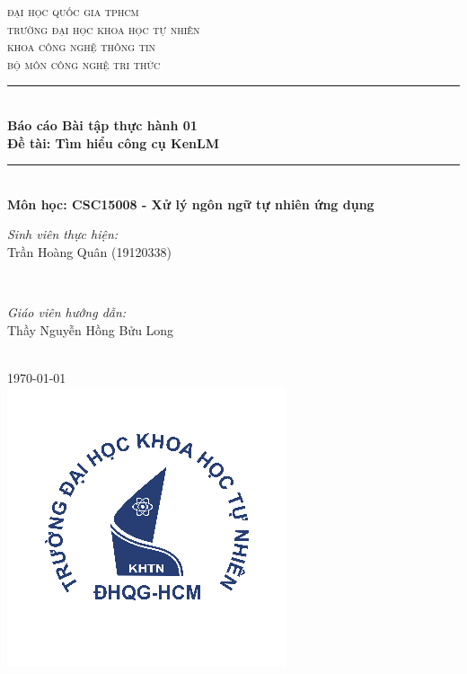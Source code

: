 \documentclass[12pt]{article}
\begin{document}
\begin{titlepage}
\newcommand{\HRule}{\rule{\linewidth}{0.5mm}}
\centering

\textsc{\LARGE đại học quốc gia tphcm}\\[1.5cm]
\textsc{\Large trường đại học khoa học tự nhiên}\\[0.5cm]
\textsc{\large khoa công nghệ thông tin}\\[0.5cm]
\textsc{bộ môn công nghệ tri thức}\\[0.5cm]

\HRule \\[0.4cm]
{ 
\huge{\bfseries{Báo cáo Bài tập thực hành 01}}\\[0.5cm]
\large{\bfseries{Đề tài: Tìm hiểu công cụ KenLM}}
}\\[0.4cm]
\HRule \\[0.5cm]

\textbf{\large Môn học: CSC15008 - Xử lý ngôn ngữ tự nhiên ứng dụng}\\[0.5cm]

\begin{minipage}{0.4\textwidth}
\begin{flushleft} \large
\emph{Sinh viên thực hiện:}\\
Trần Hoàng Quân \textsc{(19120338)}
\end{flushleft}
\end{minipage}
~
\begin{minipage}{0.4\textwidth}
\begin{flushright} \large
\emph{Giáo viên hướng dẫn:} \\
Thầy Nguyễn Hồng Bửu Long
\end{flushright}
\end{minipage}\\[2cm]

{\large \today}\\[2cm]

\includegraphics{hcmus-logo.png}\\[1cm] 

\vfill
\end{titlepage}
	
\end{document}
